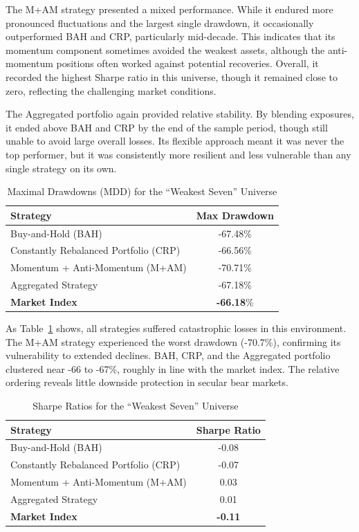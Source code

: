 \documentclass[12pt,a4paper]{report}
\begin{document}
The M+AM strategy presented a mixed performance. While it endured more pronounced fluctuations and the largest single drawdown, it occasionally outperformed BAH and CRP, particularly mid-decade. This indicates that its momentum component sometimes avoided the weakest assets, although the anti-momentum positions often worked against potential recoveries. Overall, it recorded the highest Sharpe ratio in this universe, though it remained close to zero, reflecting the challenging market conditions.

The Aggregated portfolio again provided relative stability. By blending exposures, it ended above BAH and CRP by the end of the sample period, though still unable to avoid large overall losses. Its flexible approach meant it was never the top performer, but it was consistently more resilient and less vulnerable than any single strategy on its own.

\begin{table}[h!]
\centering
\caption{Maximal Drawdowns (MDD) for the ``Weakest Seven'' Universe}
\label{tab:mdd_worst}
\begin{tabular}{lc}
\toprule
\textbf{Strategy} & \textbf{Max Drawdown} \\
\midrule
Buy-and-Hold (BAH) & -67.48\% \\
Constantly Rebalanced Portfolio (CRP) & -66.56\% \\
Momentum + Anti-Momentum (M+AM) & -70.71\% \\
Aggregated Strategy & -67.18\% \\
\textbf{Market Index} & \textbf{-66.18}\% \\
\bottomrule
\end{tabular}
\end{table}

As Table~\ref{tab:mdd_worst} shows, all strategies suffered catastrophic losses in this environment. The M+AM strategy experienced the worst drawdown (-70.7\%), confirming its vulnerability to extended declines. BAH, CRP, and the Aggregated portfolio clustered near -66 to -67\%, roughly in line with the market index. The relative ordering reveals little downside protection in secular bear markets.  

\begin{table}[h!]
\centering
\caption{Sharpe Ratios for the ``Weakest Seven'' Universe}
\label{tab:sharpe_worst}
\begin{tabular}{lc}
\toprule
\textbf{Strategy} & \textbf{Sharpe Ratio} \\
\midrule
Buy-and-Hold (BAH) & -0.08 \\
Constantly Rebalanced Portfolio (CRP) & -0.07 \\
Momentum + Anti-Momentum (M+AM) & 0.03 \\
Aggregated Strategy & 0.01 \\
\textbf{Market Index} & \textbf{-0.11} \\
\bottomrule
\end{tabular}
\end{table}
\end{document}
